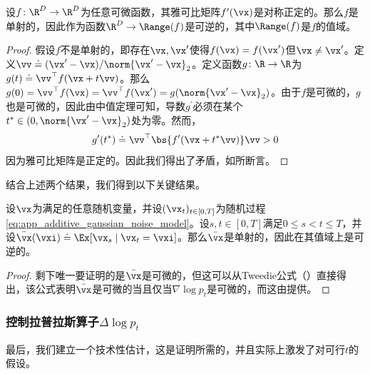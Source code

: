 \documentclass[../../book-main_zh.tex]{subfiles}
\begin{document}
\begin{lemma}\label{lem:gribonval_A2}
    设\(f \colon \R^{D} \to \R^{D}\)为任意可微函数，其雅可比矩阵\(f^{\prime}(\vx)\)是对称正定的。那么\(f\)是单射的，因此作为函数\(\R^{D} \to \Range(f)\)是可逆的，其中\(\Range(f)\)是\(f\)的值域。
\end{lemma}
\begin{proof}
    假设\(f\)不是单射的，即存在\(\vx, \vx^{\prime}\)使得\(f(\vx) = f(\vx^{\prime})\)但\(\vx \neq \vx^{\prime}\)。定义\(\vv \doteq (\vx^{\prime} - \vx)/\norm{\vx^{\prime} - \vx}_{2}\)。定义函数\(g \colon \R \to \R\)为\(g(t) \doteq \vv^{\top}f(\vx + t\vv)\)。那么\(g(0) = \vv^{\top}f(\vx) = \vv^{\top}f(\vx^{\prime}) = g(\norm{\vx^{\prime} - \vx}_{2})\)。由于\(f\)是可微的，\(g\)也是可微的，因此由中值定理可知，导数\(g^{\prime}\)必须在某个\(t^{\ast} \in (0, \norm{\vx^{\prime} - \vx}_{2})\)处为零。然而，
    \begin{equation}
        g^{\prime}(t^{\ast}) \doteq \vv^{\top}\bs{f^{\prime}(\vx +
        t^{\ast}\vv)}\vv > 0
    \end{equation}
    因为雅可比矩阵是正定的。因此我们得出了矛盾，如所断言。
\end{proof}

结合上述两个结果，我们得到以下关键结果。

\begin{corollary}\label{cor:gribonval_A2}
    设\(\vx\)为满足的任意随机变量，并设\((\vx_{t})_{t \in [0, T]}\)为随机过程\eqref{eq:app_additive_gaussian_noise_model}。设\(s, t \in [0, T]\)满足\(0 \leq s < t \leq T\)，并设\(\bar{\vx}(\vxi) \doteq \Ex[\vx_{s} \mid \vx_{t} = \vxi]\)。那么\(\bar{\vx}\)是单射的，因此在其值域上是可逆的。
\end{corollary}
\begin{proof}
    剩下唯一要证明的是\(\bar{\vx}\)是可微的，但这可以从Tweedie公式（）直接得出，该公式表明\(\bar{\vx}\)是可微的当且仅当\(\nabla \log p_{t}\)是可微的，而这由提供。
\end{proof}

\subsubsection{控制拉普拉斯算子\(\Delta \log p_{t}\)}
最后，我们建立一个技术性估计，这是证明所需的，并且实际上激发了对可行\(t\)的假设。
\end{document}
